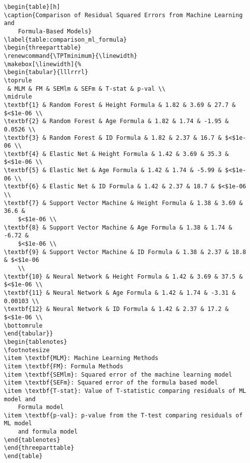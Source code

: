 \documentclass[11pt]{article}
\begin{document}
\begin{Verbatim}[tabsize=4]
\begin{table}[h]
\caption{Comparison of Residual Squared Errors from Machine Learning and
	Formula-Based Models}
\label{table:comparison_ml_formula}
\begin{threeparttable}
\renewcommand{\TPTminimum}{\linewidth}
\makebox[\linewidth]{%
\begin{tabular}{lllrrrl}
\toprule
 & MLM & FM & SEMlm & SEFm & T-stat & p-val \\
\midrule
\textbf{1} & Random Forest & Height Formula & 1.82 & 3.69 & 27.7 & $<$1e-06 \\
\textbf{2} & Random Forest & Age Formula & 1.82 & 1.74 & -1.95 & 0.0526 \\
\textbf{3} & Random Forest & ID Formula & 1.82 & 2.37 & 16.7 & $<$1e-06 \\
\textbf{4} & Elastic Net & Height Formula & 1.42 & 3.69 & 35.3 & $<$1e-06 \\
\textbf{5} & Elastic Net & Age Formula & 1.42 & 1.74 & -5.99 & $<$1e-06 \\
\textbf{6} & Elastic Net & ID Formula & 1.42 & 2.37 & 18.7 & $<$1e-06 \\
\textbf{7} & Support Vector Machine & Height Formula & 1.38 & 3.69 & 36.6 &
	$<$1e-06 \\
\textbf{8} & Support Vector Machine & Age Formula & 1.38 & 1.74 & -6.72 &
	$<$1e-06 \\
\textbf{9} & Support Vector Machine & ID Formula & 1.38 & 2.37 & 18.8 & $<$1e-06
	\\
\textbf{10} & Neural Network & Height Formula & 1.42 & 3.69 & 37.5 & $<$1e-06 \\
\textbf{11} & Neural Network & Age Formula & 1.42 & 1.74 & -3.31 & 0.00103 \\
\textbf{12} & Neural Network & ID Formula & 1.42 & 2.37 & 17.2 & $<$1e-06 \\
\bottomrule
\end{tabular}}
\begin{tablenotes}
\footnotesize
\item \textbf{MLM}: Machine Learning Methods
\item \textbf{FM}: Formula Methods
\item \textbf{SEMlm}: Squared error of the machine learning model
\item \textbf{SEFm}: Squared error of the formula based model
\item \textbf{T-stat}: Value of T-statistic comparing residuals of ML model and
	Formula model
\item \textbf{p-val}: p-value from the T-test comparing residuals of ML model
	and formula model
\end{tablenotes}
\end{threeparttable}
\end{table}

\end{Verbatim}
\end{document}

